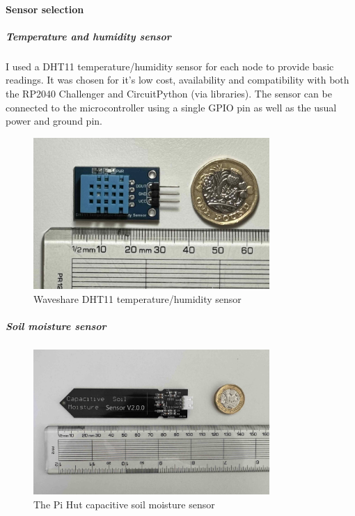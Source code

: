 \paragraph{Sensor selection}

\subparagraph{Temperature and humidity sensor}

I used a DHT11 temperature/humidity sensor for each node to provide basic
readings. It was chosen for it's low cost, availability and compatibility with
both the RP2040 Challenger and CircuitPython (via libraries). The sensor can be
connected to the microcontroller using a single GPIO pin as well as the usual
power and ground pin.

\begin{figure}[H]
    \centering
    \includegraphics[width=0.8\textwidth]{contents/part-2/fig2/dht11.jpg}
    \caption{Waveshare DHT11 temperature/humidity sensor}
    \label{fig:dht11}
\end{figure}

\subparagraph{Soil moisture sensor}

\begin{figure}[H]
    \centering
    \includegraphics[width=0.8\textwidth]{contents/part-2/fig2/soil-sensor.jpg}
    \caption{The Pi Hut capacitive soil moisture sensor}
    \label{fig:soil-sensor}
\end{figure}

